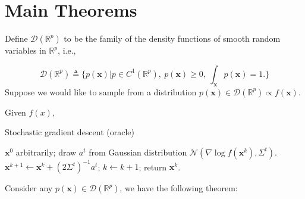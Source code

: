 \documentclass[preprint,12pt,3p]{elsarticle}
\newcommand{\bx}{\mathbf{x}}
\newcommand{\R}{\mathbb{R}}
\newcommand{\D}{\mathscr{D}}
\newcommand{\N}{\mathscr{N}}
\begin{document}
\section{Main Theorems}

Define $\D(\R^p)$ to be the family of the density functions of smooth random variables in $\R^p$, i.e.,

\begin{equation}
\D(\R^p)\triangleq \{p(\bx)\Big| p\in C^1(\R^p),~p(\bx) \geq 0,~ \int_\bx p(\bx) = 1.\}
\end{equation}
Suppose we would like to sample from a distribution $p(\bx)\in \D(\R^p) \propto f(\bx)$. 
\begin{algorithm}[H]
{\small
Given $f(x)$, 
\begin{algorithmic}\caption{Stochastic gradient descent (oracle)}\label{Alg:SGD}
 $ \bx^0$ arbitrarily;
\STATE draw $a^t$ from Gaussian distribution $\N(\nabla \log f(\bx^k), \Sigma^{t})$.
\STATE
$\bx^{k+1} \gets \bx^k + (2\Sigma^t)^{-1} a^t$;
\STATE $k\gets k+1$;
\ENDWHILE
\STATE return $\bx^k$.
\end{algorithmic}}
\end{algorithm}


Consider any $p(\bx)\in \D(\R^p)$, we have the following theorem:
\end{document}
